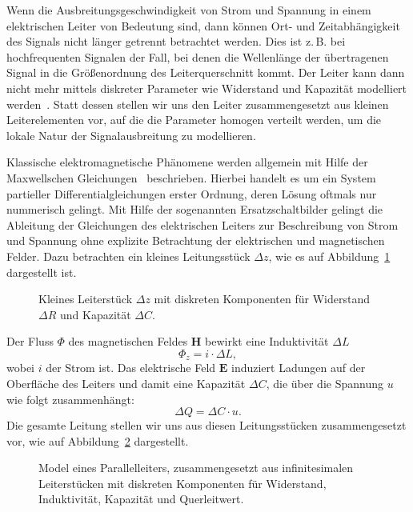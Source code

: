 \documentclass[paper=a4, parskip=half-, ngerman, fontsize=11pt]{scrreprt}
\begin{document}
Wenn die Ausbreitungsgeschwindigkeit von Strom und Spannung in einem elektrischen Leiter von Bedeutung sind, dann
können Ort- und Zeitabhängigkeit des Signals nicht länger getrennt betrachtet werden. Dies ist z.\,B. bei
hochfrequenten Signalen der Fall, bei denen die Wellenlänge der übertragenen Signal in die Größenordnung des
Leiterquerschnitt kommt. Der Leiter kann dann nicht mehr mittels diskreter Parameter wie Widerstand und Kapazität
modelliert werden~\cite{LeiterTheorie}. Statt dessen stellen wir uns den Leiter zusammengesetzt aus kleinen
Leiterelementen vor, auf die die Parameter homogen verteilt werden, um die lokale Natur der Signalausbreitung zu
modellieren.

Klassische elektromagnetische Phänomene werden allgemein mit Hilfe der Maxwellschen
Gleichungen~\cite{MaxwellGleichungen} beschrieben. Hierbei handelt es um ein System partieller Differentialgleichungen
erster Ordnung, deren Lösung oftmals nur nummerisch gelingt. Mit Hilfe der sogenannten Ersatzschaltbilder gelingt die
Ableitung der Gleichungen des elektrischen Leiters zur Beschreibung von Strom und Spannung ohne explizite Betrachtung
der elektrischen und magnetischen Felder. Dazu betrachten ein kleines Leitungsstück $\Delta z$, wie es auf
Abbildung~\ref{Leitung1} dargestellt ist.
\begin{figure}[htbp]
    \begin{center}
        
        \caption{Kleines Leiterstück $\Delta z$ mit diskreten Komponenten für Widerstand $\Delta R$ und
        Kapazität $\Delta C$.}
        \label{Leitung1}
    \end{center}
\end{figure}

Der Fluss $\Phi$ des magnetischen Feldes $\textbf{H}$ bewirkt eine Induktivität $\Delta L$
\[ \Phi_{z} = i \cdot \Delta L, \] wobei $i$ der Strom ist.
Das elektrische Feld $\textbf{E}$ induziert Ladungen auf der Oberfläche des Leiters und damit eine Kapazität $\Delta C$,
die über die Spannung $u$ wie folgt zusammenhängt:
\[ \Delta Q = \Delta C \cdot u . \]
Die gesamte Leitung stellen wir uns aus diesen Leitungsstücken zusammengesetzt vor, wie auf Abbildung~\ref{Leitung2}
dargestellt.
\begin{figure}[htb]
    \begin{center}
        
        \caption{Model eines Parallelleiters, zusammengesetzt aus infinitesimalen Leiterstücken mit diskreten
        Komponenten für Widerstand, Induktivität, Kapazität und Querleitwert.}
        \label{Leitung2}
    \end{center}
\end{figure}
\end{document}
